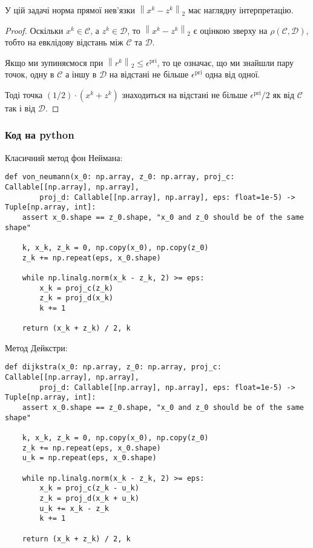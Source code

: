 \begin{proposition}
    У цій задачі норма прямої нев'язки $\left\|x^k - z^k\right\|_2$ має наглядну інтерпретацію.
\end{proposition}

\begin{proof}
    Оскільки $x^k \in \mathcal{C}$, а $z^k \in \mathcal{D}$, то $\left\|x^k - z^k\right\|_2$ є оцінкою зверху на $\rho \left(\mathcal{C}, \mathcal{D}\right)$, тобто на евклідову відстань між $\mathcal{C}$ та $\mathcal{D}$. \medskip
    
    Якщо ми зупиняємося при $\left\|r^k\right\|_2 \le \epsilon^{\text{pri}}$, то це означає, що ми знайшли пару точок, одну в $\mathcal{C}$ а іншу в $\mathcal{D}$  на відстані не більше $\epsilon^{\text{pri}}$ одна від одної. \medskip
    
    Тоді точка $(1 / 2) \cdot \left( x^k + z^k \right)$ знаходиться на відстані не більше $\epsilon^{\text{pri}} / 2$ як від $\mathcal{C}$ так і від $\mathcal{D}$.
\end{proof}

\subsubsection{Код на python}

Класичний метод фон Неймана:

\begin{verbatim}
def von_neumann(x_0: np.array, z_0: np.array, proj_c: Callable[[np.array], np.array], 
        proj_d: Callable[[np.array], np.array], eps: float=1e-5) -> Tuple[np.array, int]:
    assert x_0.shape == z_0.shape, "x_0 and z_0 should be of the same shape"

    k, x_k, z_k = 0, np.copy(x_0), np.copy(z_0)
    z_k += np.repeat(eps, x_0.shape)

    while np.linalg.norm(x_k - z_k, 2) >= eps:
        x_k = proj_c(z_k)
        z_k = proj_d(x_k)
        k += 1

    return (x_k + z_k) / 2, k
\end{verbatim}

Метод Дейкстри:

\begin{verbatim}
def dijkstra(x_0: np.array, z_0: np.array, proj_c: Callable[[np.array], np.array], 
        proj_d: Callable[[np.array], np.array], eps: float=1e-5) -> Tuple[np.array, int]:
    assert x_0.shape == z_0.shape, "x_0 and z_0 should be of the same shape"

    k, x_k, z_k = 0, np.copy(x_0), np.copy(z_0)
    z_k += np.repeat(eps, x_0.shape)
    u_k = np.repeat(eps, x_0.shape)

    while np.linalg.norm(x_k - z_k, 2) >= eps:
        x_k = proj_c(z_k - u_k)
        z_k = proj_d(x_k + u_k)
        u_k += x_k - z_k
        k += 1

    return (x_k + z_k) / 2, k
\end{verbatim}

